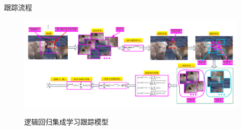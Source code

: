 \begin{frame}{跟踪流程}
\begin{figure}[htbp]
  \centering
  \includegraphics[width=\linewidth]{figures/LR_ArchitecturalStructure.pdf}\\
\caption{逻辑回归集成学习跟踪模型}
\label{fig:LR_ArchitecturalStructure}
\end{figure}

\end{frame}




